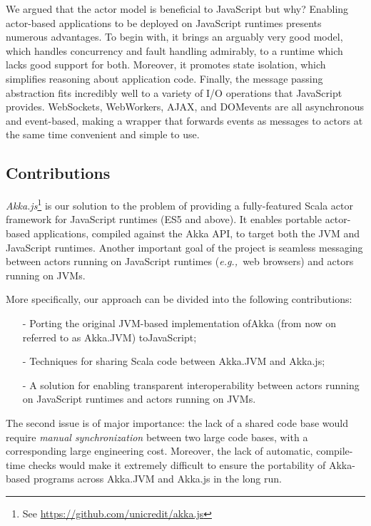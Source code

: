 \documentclass{sig-alternate}
\newcommand{\eg}{{\em e.g.,~}}
\begin{document}
We argued that the actor model is beneficial to JavaScript but why? Enabling actor-based applications to be deployed on JavaScript runtimes presents numerous advantages. To begin with, it brings an arguably very good model, which handles concurrency and fault handling admirably, to a runtime which lacks good support for both. Moreover, it promotes state isolation, which simplifies reasoning about application code. Finally, the message passing abstraction fits incredibly well to a variety of I/O operations that JavaScript provides. WebSockets, WebWorkers, AJAX, and DOM\newline events are all asynchronous and event-based, making a wrapper that forwards events as messages to actors at the same time convenient and simple to use.

\subsection{Contributions}

{\em Akka.js}\footnote{See \url{https://github.com/unicredit/akka.js}} is our solution to the problem of providing a fully-featured Scala actor framework for JavaScript runtimes (ES5 and above). It enables portable actor-based applications, compiled against the Akka API, to target both the JVM and JavaScript runtimes. Another important goal of the project is seamless messaging between actors running on JavaScript runtimes (\eg web browsers) and actors running on JVMs.

More specifically, our approach can be divided into the following contributions:
\begin{itemize}
	\item[-] Porting the original JVM-based implementation of\newline Akka (from now on referred to as Akka.JVM) to\newline JavaScript;
	\item[-] Techniques for sharing Scala code between Akka.JVM and Akka.js;
    \item[-] A solution for enabling transparent interoperability between actors running on JavaScript runtimes and actors running on JVMs.
\end{itemize}
\noindent
The second issue is of major importance: the lack of a shared code base would require {\em manual synchronization} between two large code bases, with a corresponding large engineering cost. Moreover, the lack of automatic, compile-time checks would make it extremely difficult to ensure the portability of Akka-based programs across Akka.JVM and Akka.js in the long run.
\end{document}
